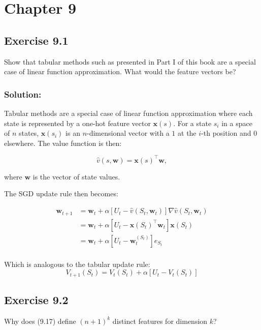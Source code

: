 \section*{Chapter 9}

\subsection*{Exercise 9.1}

Show that tabular methods such as presented in Part I of this book are a special case of linear function approximation. What would the feature vectors be?

\subsubsection*{Solution:}

Tabular methods are a special case of linear function approximation where each state is represented by a one-hot feature vector $\mathbf{x}(s)$. For a state $s_i$ in a space of $n$ states, $\mathbf{x}(s_i)$ is an $n$-dimensional vector with a $1$ at the $i$-th position and $0$ elsewhere. The value function is then:

\[
\hat{v}(s, \mathbf{w}) = \mathbf{x}(s)^\top \mathbf{w},
\]

where $\mathbf{w}$ is the vector of state values.

The SGD update rule then becomes:

\begin{align*}
    \mathbf{w}_{t+1} &= \mathbf{w}_t + \alpha \left[ U_t - \hat{v}(S_t, \mathbf{w}_t) \right] \nabla \hat{v}(S_t, \mathbf{w}_t) \\
    &= \mathbf{w}_t + \alpha \left[ U_t - \mathbf{x}(S_t)^\top \mathbf{w}_t \right] \mathbf{x}(S_t) \\
    &= \mathbf{w}_t + \alpha \left[ U_t - \mathbf{w}_t^{(S_t)}  \right] e_{S_t} \\
\end{align*}

Which is analogous to the tabular update rule:
\[
V_{t+1}(S_t) = V_t(S_t) + \alpha \left[ U_t - V_t(S_t) \right]
\]



\subsection*{Exercise 9.2}

Why does (9.17) define $(n + 1)^k$ distinct features for dimension $k$?

